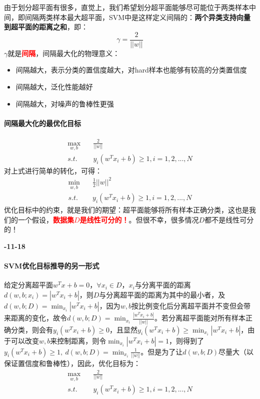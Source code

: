 由于划分超平面有很多，直觉上，我们希望划分超平面能够尽可能位于两类样本中间，即间隔两类样本最大超平面，SVM中是这样定义间隔的：\textbf{两个异类支持向量到超平面的距离之和}，即：
$$
\gamma = \frac{2}{||w||}
$$
$\gamma$就是\textbf{\textcolor{red}{间隔}}，间隔最大化的物理意义：
\begin{itemize}
	\item 间隔越大，表示分类的置信度越大，对hard样本也能够有较高的分类置信度
	\item 间隔越大，泛化性能越好
	\item 间隔越大，对噪声的鲁棒性更强
\end{itemize}


\paragraph{间隔最大化的最优化目标}
\begin{align}
	\mathop{max}_{w, b}&\quad \frac{2}{||w||} \nonumber \\
	s.t.&\quad y_i(w^T x_i + b) \geqslant 1, i = 1, 2, ..., N \nonumber
\end{align}
对上式进行简单的转化，可得：
\begin{align}
	\mathop{min}_{w, b}&\quad \frac{1}{2}||w||^2 \nonumber \\
	s.t.&\quad y_i(w^T x_i + b) \geqslant 1, i = 1, 2, ..., N \nonumber
\end{align}
优化目标中的约束，就是我们的期望：超平面能够将所有样本正确分类，这也是我们的一个假设，\textcolor{red}{\textbf{数据集$D$是线性可分的！}}。但很不幸，很多情况$D$都不是线性可分的！

\textbf{-11-18}\\
\paragraph{SVM优化目标推导的另一形式}
给定分离超平面$w^T x + b = 0$，$\forall x_i \in D$，$x_i$与分离平面的距离$d(w, b; x_i) = |w^T x_i + b|$，则$D$与分离超平面的距离为其中的最小者，及$d(w, b; D) = \mathop{min}_{x_i} |w^T x_i +b|$，因为$w, b$按比例变化后分离超平面并不变但会带来距离的变化，故令$d(w, b; D) = \mathop{min}_{x_i} \frac{|w^T x_i + b|}{||w||}$。若分离超平面能对所有样本正确分类，则会有$y_i ( w^T x_i + b ) \geq 0$，且显然$y_i ( w^T x_i + b ) \geq \mathop{min}_{x_i} |w^T x_i + b|$，由于可以改变$w, b$来控制距离，则令$\mathop{min}_{x_i} |w^T x_i + b| = 1$，则得到了$y_i ( w^T x_i + b ) \geq 1,\ d(w, b; D) = \mathop{min}_{x_i} \frac{1}{||w||}$。但是为了让$d(w, b; D)$尽量大（以保证置信度和鲁棒性），因此，优化目标为：
\begin{align}
	\mathop{max}_{w, b}&\quad \frac{2}{||w||} \nonumber \\
	s.t.&\quad y_i(w^T x_i + b) \geqslant 1, i = 1, 2, ..., N \nonumber
\end{align}


